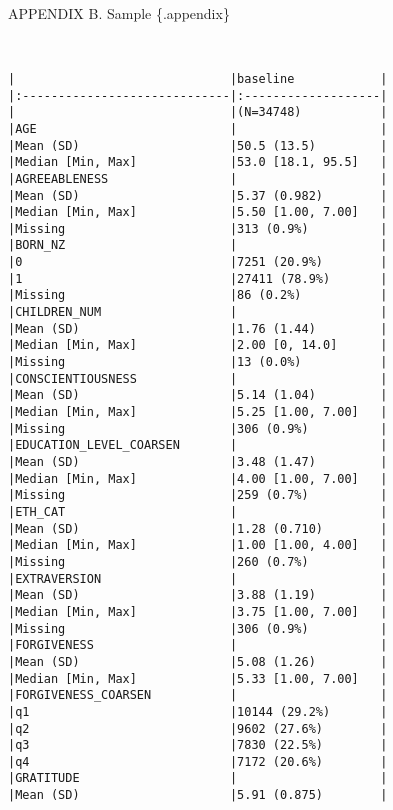 \documentclass[
  singlecolumn]{report}
\begin{document}
\newpage{}

APPENDIX B. Sample \{.appendix\}

\begin{verbatim}


|                              |baseline            |
|:-----------------------------|:-------------------|
|                              |(N=34748)           |
|AGE                           |                    |
|Mean (SD)                     |50.5 (13.5)         |
|Median [Min, Max]             |53.0 [18.1, 95.5]   |
|AGREEABLENESS                 |                    |
|Mean (SD)                     |5.37 (0.982)        |
|Median [Min, Max]             |5.50 [1.00, 7.00]   |
|Missing                       |313 (0.9%)          |
|BORN_NZ                       |                    |
|0                             |7251 (20.9%)        |
|1                             |27411 (78.9%)       |
|Missing                       |86 (0.2%)           |
|CHILDREN_NUM                  |                    |
|Mean (SD)                     |1.76 (1.44)         |
|Median [Min, Max]             |2.00 [0, 14.0]      |
|Missing                       |13 (0.0%)           |
|CONSCIENTIOUSNESS             |                    |
|Mean (SD)                     |5.14 (1.04)         |
|Median [Min, Max]             |5.25 [1.00, 7.00]   |
|Missing                       |306 (0.9%)          |
|EDUCATION_LEVEL_COARSEN       |                    |
|Mean (SD)                     |3.48 (1.47)         |
|Median [Min, Max]             |4.00 [1.00, 7.00]   |
|Missing                       |259 (0.7%)          |
|ETH_CAT                       |                    |
|Mean (SD)                     |1.28 (0.710)        |
|Median [Min, Max]             |1.00 [1.00, 4.00]   |
|Missing                       |260 (0.7%)          |
|EXTRAVERSION                  |                    |
|Mean (SD)                     |3.88 (1.19)         |
|Median [Min, Max]             |3.75 [1.00, 7.00]   |
|Missing                       |306 (0.9%)          |
|FORGIVENESS                   |                    |
|Mean (SD)                     |5.08 (1.26)         |
|Median [Min, Max]             |5.33 [1.00, 7.00]   |
|FORGIVENESS_COARSEN           |                    |
|q1                            |10144 (29.2%)       |
|q2                            |9602 (27.6%)        |
|q3                            |7830 (22.5%)        |
|q4                            |7172 (20.6%)        |
|GRATITUDE                     |                    |
|Mean (SD)                     |5.91 (0.875)        |

\end{verbatim}
\end{document}
